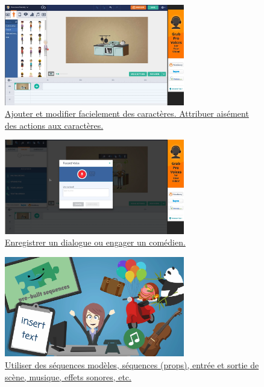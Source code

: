 \begin{frame}[allowframebreaks]
                   \begin{figure}
                     \centering
                     \includegraphics[width = 0.7\textwidth]{personnage.png}
                     \caption{\tiny{\href{run:personnage.png}{Ajouter et modifier facielement des caractères. Attribuer aisément des actions aux caractères.}}}
                   \end{figure}
                   
                    \begin{figure}
                     \centering
                     \includegraphics[width = 0.7\textwidth]{voix.png}
                     \caption{\tiny{\href{run:voix.png}{Enregistrer un dialogue ou engager un comédien.}}}
                   \end{figure}
                   
                   \begin{figure}
                     \centering
                     \includegraphics[width = 0.7\textwidth]{autres.png}
                     \caption{\tiny{\href{run:autres.png}{Utiliser des séquences modèles, séquences (props), entrée et sortie de scène, musique, effets sonores, etc.}}}
                   \end{figure}
                   
			
			
			\end{frame}	
